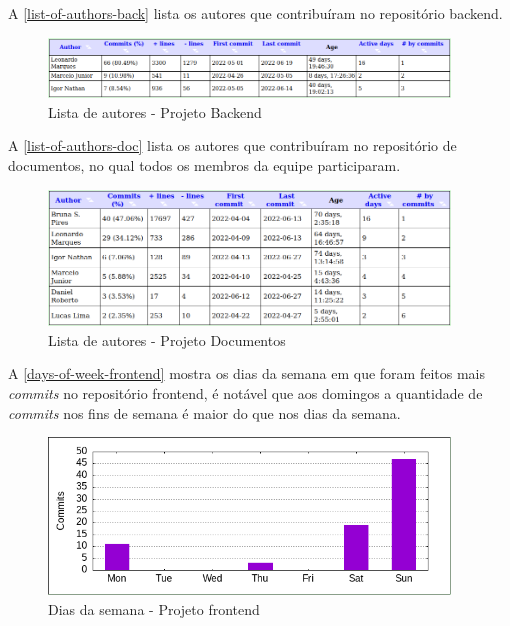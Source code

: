 A \autoref{list-of-authors-back} lista os autores que contribuíram no repositório \gls{backend}.
\begin{figure}[H]
	\centering
	\caption{\label{list-of-authors-back}Lista de autores - Projeto Backend}
	\includegraphics[width=0.95\textwidth]{../imagens/stats/list-of-authors-backend.png}
\end{figure}

A \autoref{list-of-authors-doc} lista os autores que contribuíram no repositório de documentos, no qual todos os membros da equipe participaram.
\begin{figure}[H]
	\centering
	\caption{\label{list-of-authors-doc}Lista de autores - Projeto Documentos}
	\includegraphics[width=0.95\textwidth]{../imagens/stats/list-of-authors-documentos.png}
\end{figure}

A \autoref{days-of-week-frontend} mostra os dias da semana em que foram feitos mais \emph{commits} no repositório \gls{frontend}, é notável que aos domingos a quantidade de \emph{commits} nos fins de semana é maior do que nos dias da semana.
\begin{figure}[H]
	\centering
	\caption{\label{days-of-week-frontend}Dias da semana - Projeto \gls{frontend}}
	\includegraphics[width=0.95\textwidth]{../imagens/stats/days-of-week-frontend.png}
\end{figure}

